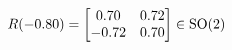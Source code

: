 \documentclass[preview]{standalone}
\begin{document}
\begin{align*}
\special{dvisvgm:raw <g id='unique000'>}R(-0.80) = \begin{bmatrix} 0.70 & 0.72 \\ -0.72 & 0.70 \end{bmatrix} \in \text{SO}(2)\special{dvisvgm:raw </g>}
\end{align*}
\end{document}
